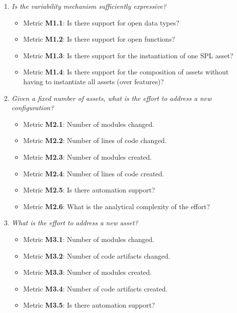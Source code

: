 \begin{enumerate}[Q1]
\item \emph{Is the variability mechanism sufficiently expressive?}
\begin{itemize}
\item Metric \textbf{M1.1}: Is there support for open data types?
\item Metric \textbf{M1.2}: Is there support for open functions?
\item Metric \textbf{M1.3}: Is there support for the instantiation of one SPL asset?
\item Metric \textbf{M1.4}: Is there support for the composition of assets without having to instantiate all assets (over features)?
\end{itemize}

\item \emph{Given a fixed number of assets, what is the effort to address a new configuration?}
\begin{itemize}
\item Metric \textbf{M2.1}: Number of modules changed.
\item Metric \textbf{M2.2}: Number of lines of code changed.
\item Metric \textbf{M2.3}: Number of modules created.
\item Metric \textbf{M2.4}: Number of lines of code created.
\item Metric \textbf{M2.5}: Is there automation support?
\item Metric \textbf{M2.6}: What is the analytical complexity of the effort?
\end{itemize}


\item \emph{What is the effort to address a new asset?}
\begin{itemize}
\item Metric \textbf{M3.1}: Number of modules changed.
\item Metric \textbf{M3.2}: Number of code artifacts changed.
\item Metric \textbf{M3.3}: Number of modules created.
\item Metric \textbf{M3.4}: Number of code artifacts created.
\item Metric \textbf{M3.5}: Is there automation support?
\end{itemize}


\end{enumerate}
